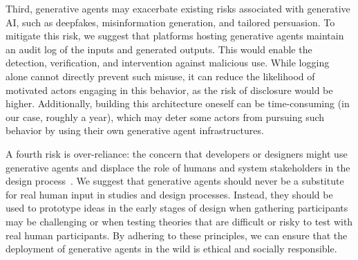 Third, generative agents may exacerbate existing risks associated with generative AI, such as deepfakes, misinformation generation, and tailored persuasion. To mitigate this risk, we suggest that platforms hosting generative agents maintain an audit log of the inputs and generated outputs. This would enable the detection, verification, and intervention against malicious use. While logging alone cannot directly prevent such misuse, it can reduce the likelihood of motivated actors engaging in this behavior, as the risk of disclosure would be higher. Additionally, building this architecture oneself can be time-consuming (in our case, roughly a year), which may deter some actors from pursuing such behavior by using their own generative agent infrastructures.

A fourth risk is over-reliance: the concern that developers or designers might use generative agents and displace the role of humans and system stakeholders in the design process~\cite{9_park2022socialsimulacra}. We suggest that generative agents should never be a substitute for real human input in studies and design processes. Instead, they should be used to prototype ideas in the early stages of design when gathering participants may be challenging or when testing theories that are difficult or risky to test with real human participants. By adhering to these principles, we can ensure that the deployment of generative agents in the wild is ethical and socially responsible.
